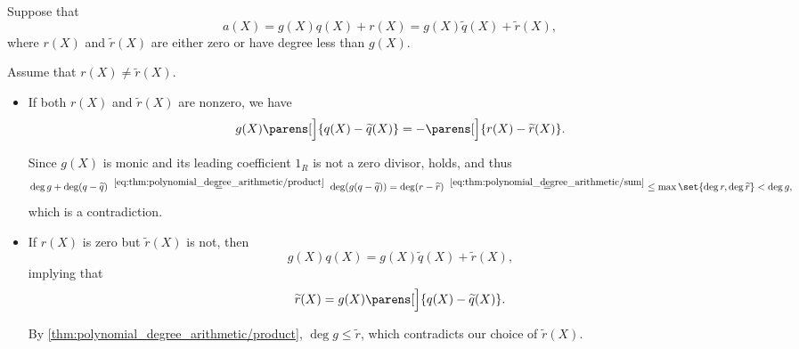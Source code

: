 \begin{defproof}
  \UniquenessSubProof Suppose that
  \begin{equation*}
    a(X) = g(X)q(X) + r(X) = g(X) \widetilde{q}(X) + \widetilde{r}(X),
  \end{equation*}
  where \( r(X) \) and \( \widetilde{r}(X) \) are either zero or have degree less than \( g(X) \).

  Assume that \( r(X) \neq \widetilde{r}(X) \).

  \begin{itemize}
    \item If both \( r(X) \) and \( \widetilde{r}(X) \) are nonzero, we have
    \begin{equation*}
      g(X) \parens[\Big]{ q(X) - \widetilde{q}(X) } = -\parens[\Big]{ r(X) - \widetilde{r}(X) }.
    \end{equation*}

    Since \( g(X) \) is monic and its leading coefficient \( 1_R \) is not a zero divisor,  holds, and thus
    \begin{equation*}
      \deg g + \deg(q - \widetilde{q})
      \reloset {\eqref{eq:thm:polynomial_degree_arithmetic/product}} =
      \deg(g (q - \widetilde{q}))
      =
      \deg(r - \widetilde{r})
      \reloset {\eqref{eq:thm:polynomial_degree_arithmetic/sum}} =
      \leq \max\set{ \deg r, \deg \widetilde{r} }
      <
      \deg g,
    \end{equation*}
    which is a contradiction.

    \item If \( r(X) \) is zero but \( \widetilde{r}(X) \) is not, then
    \begin{equation*}
      g(X) q(X) = g(X) \widetilde{q}(X) + \widetilde{r}(X),
    \end{equation*}
    implying that
    \begin{equation*}
      \widetilde{r}(X) = g(X) \parens[\Big]{ q(X) - \widetilde{q}(X) }.
    \end{equation*}

    By \eqref{thm:polynomial_degree_arithmetic/product}, \( \deg g \leq \widetilde{r} \), which contradicts our choice of \( \widetilde{r}(X) \).
  \end{itemize}
\end{defproof}

